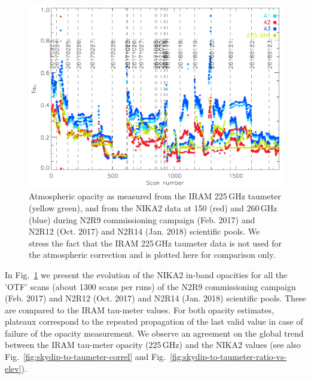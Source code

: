 \begin{figure}[ht]
\begin{center}
\includegraphics[scale=1.0]{Figures/opacity_evol_run_9_12_14.pdf}
\caption[Zenith opacity monitoring during N2R9, N2R12 and
  N2R14]{Atmospheric opacity as measured from the IRAM 225\,GHz
  taumeter (yellow green), and from the NIKA2 data at 150 (red) and
  260\,GHz (blue) during N2R9 commissioning campaign (Feb. 2017) and
  N2R12 (Oct. 2017) and N2R14 (Jan. 2018) scientific pools. We
  stress the fact that the IRAM 225\,GHz taumeter data is not used for
  the atmospheric correction and is plotted here for comparison only.
  \label{fig:taumeas}}
\end{center}
\end{figure}




In Fig.~\ref{fig:taumeas}  we present the evolution of the NIKA2 in-band
opacities for all the 'OTF' scans (about 1300 scans per runs) of the
N2R9 commissioning campaign (Feb. 2017) and N2R12 (Oct. 2017) and
N2R14 (Jan. 2018) scientific pools. These are compared to the IRAM
tau-meter values. For both opacity estimates, plateaux correspond to
the repeated propagation of the last valid value in case of failure of
the opacity measurement. We observe an agreement on the
global trend between the IRAM tau-meter opacity (225\,GHz) and the
NIKA2 values (see also Fig.~\ref{fig:skydip-to-taumeter-correl} and
Fig.~\ref{fig:skydip-to-taumeter-ratio-vs-elev}).




